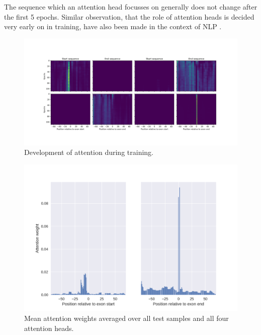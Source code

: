 The sequence which an attention head focusses on generally does not change after the first 5 epochs. Similar observation, that the role of attention heads is decided very early on in training, have also been made in the context of NLP \cite{sixteenheads}.



\begin{figure}
	\centering\includegraphics[width=1\textwidth]{../visualizations/ch5-results/attention_heatmap.png} 
	\caption{Development of attention during training. }
	\label{fig:attn_heatmap}
\end{figure}



\begin{figure}
	\centering\includegraphics[width=1\textwidth]{../visualizations/ch5-results/mean_attention_barchart.png} 
	\caption{Mean attention weights averaged over all test samples and all four attention heads. }
	\label{fig:mean_attn}
\end{figure}

